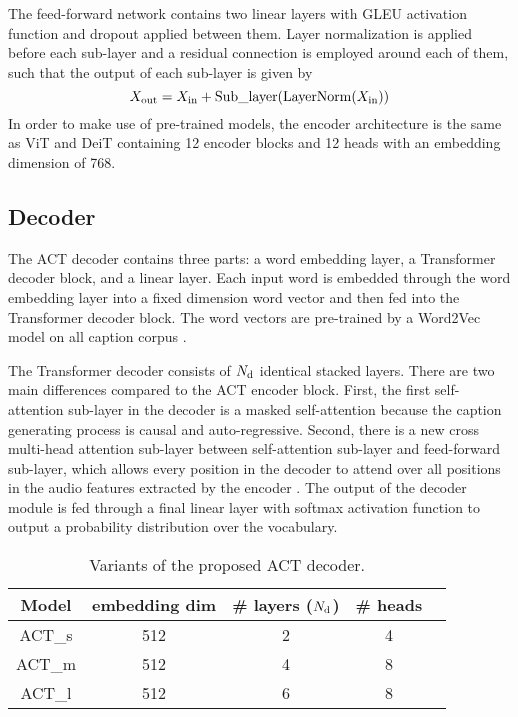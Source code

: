 \documentclass{article}
\begin{document}
\begin{sloppy}
The feed-forward network contains two linear layers with GLEU activation function and dropout applied between them. Layer normalization is applied before each sub-layer and a residual connection is employed around each of them, such that the output of each sub-layer is given by
\begin{equation}
  \label{eqn:sub_layer_pre_norm}
  X_{\rm out} = X_{\rm in} + {\rm Sub\_layer}({\rm LayerNorm}(X_{\rm in}))
\end{equation}
In order to make use of pre-trained models, the encoder architecture is the same as ViT and DeiT containing \num{12} encoder blocks and \num{12} heads with an embedding dimension of \num{768}.

\subsection{Decoder}
\label{ssec:decoder}
The ACT decoder contains three parts: a word embedding layer, a Transformer decoder block, and a linear layer. Each input word is embedded through the word embedding layer into a fixed dimension word vector and then fed into the Transformer decoder block. The word vectors are pre-trained by a Word2Vec model on all caption corpus \cite{mikolov2013efficient}.

The Transformer decoder consists of $N_{\rm d}$ identical stacked layers. There are two main differences compared to the ACT encoder block. First, the first self-attention sub-layer in the decoder is a masked self-attention because the caption generating process is causal and auto-regressive. Second, there is a new cross multi-head attention sub-layer between self-attention sub-layer and feed-forward sub-layer, which allows every position in the decoder to attend over all positions in the audio features extracted by the encoder \cite{vaswani2017attention}. The output of the decoder module is fed through a final linear layer with softmax activation function to output a probability distribution over the vocabulary. 

\begin{table}[!t]
    \centering
    \begin{tabular}{c c c c c}
    \hline 
    Model & embedding dim & \# layers ($N_{\rm d}$) & \# heads\\
    \hline 
    ACT\_s & 512 & 2 & 4 \\
    ACT\_m & 512 & 4 & 8 \\
    ACT\_l & 512 & 6 & 8 \\
    \hline
    \end{tabular}
    \caption{Variants of the proposed ACT decoder. }
    \label{table:models_arch}
\end{table}


\end{sloppy}
\end{document}
